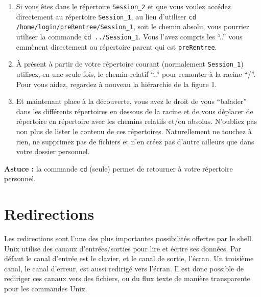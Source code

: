 \documentclass{article}
\begin{document}
\begin{exercice}
\begin{enumerate}
\medskip

\item
Si vous êtes dans le répertoire \texttt{Session\_2} et que vous voulez accédez directement au répertoire \texttt{Session\_1}, au lieu d'utiliser \texttt{cd /home/login/preRentree/Session\_1}, soit le chemin absolu, vous pourriez utiliser la commande  \texttt{cd ../Session\_1}.
Vous l'avez compris les ``..'' vous emmènent directement au répertoire parent qui est \texttt{preRentree}.

\medskip

\item
À présent à partir de votre répertoire courant (normalement \texttt{Session\_1}) utilisez, en une seule fois, le chemin relatif ``..'' pour remonter à la racine ``/''. Pour vous aidez, regardez à nouveau la hiérarchie de la figure 1.

\medskip

\item
Et maintenant place à la découverte, vous avez le droit de vous ``balader'' dans les différents répertoires en dessous de la racine et de vous déplacer de répertoire en répertoire avec les chemins relatifs et/ou absolus. N'oubliez pas non plus de lister le contenu de ces répertoires.
Naturellement ne touchez à rien, ne supprimez pas de fichiers et n'en créez pas d'autre ailleurs que dans votre dossier personnel.

\end{enumerate}

\textbf{Astuce :} la commande \texttt{cd} (seule) permet de retourner à votre répertoire personnel.

\end{exercice}

\hypertarget{Redirections}{
\section{Redirections}\label{Redirections}}

Les redirections sont l'une des plus importantes possibilités offertes par le shell.
Unix utilise des canaux d'entrées/sorties pour lire et écrire ses données. Par défaut le canal d'entrée est le clavier, et le canal de sortie, l'écran. Un troisième canal, le canal d'erreur, est aussi redirigé vers l'écran.
Il est donc possible de rediriger ces canaux vers des fichiers, ou du flux texte de manière transparente pour les commandes Unix.
\end{document}
